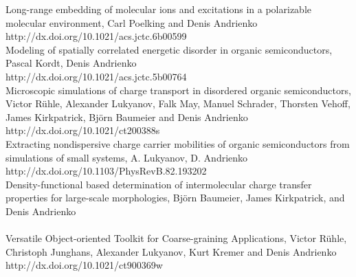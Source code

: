 \vspace{0.1cm}
\noindent
\cite{poelking_long-range_2016} Long-range embedding of molecular ions and excitations in a polarizable molecular environment, Carl Poelking and Denis Andrienko \\
{http://dx.doi.org/10.1021/acs.jctc.6b00599} \\

\vspace{0.1cm}
\noindent
\cite{kordt_modeling_2016} Modeling of spatially correlated energetic disorder in organic semiconductors,
Pascal Kordt, Denis Andrienko \\
{http://dx.doi.org/10.1021/acs.jctc.5b00764} \\

\vspace{0.1cm}
\noindent
\cite{ruhle_microscopic_2011} Microscopic simulations of charge transport in disordered organic semiconductors, 
Victor R\"uhle, Alexander Lukyanov, Falk May, Manuel Schrader, Thorsten Vehoff, James Kirkpatrick, Bj\"orn Baumeier and Denis Andrienko \\
{http://dx.doi.org/10.1021/ct200388s} \\

\vspace{0.1cm}
\noindent
\cite{lukyanov_extracting_2010} Extracting nondispersive charge carrier mobilities of organic semiconductors from simulations of small systems, A. Lukyanov, D. Andrienko \\
{http://dx.doi.org/10.1103/PhysRevB.82.193202} \\

\vspace{0.1cm}
\noindent
\cite{baumeier_density-functional_2010}
      Density-functional based determination of intermolecular charge transfer properties for large-scale morphologies, Bj{\"o}rn Baumeier,  James Kirkpatrick, and Denis Andrienko \\
        \\

\vspace{0.1cm}
\noindent
\cite{ruhle_versatile_2009} Versatile Object-oriented Toolkit for Coarse-graining Applications, 
Victor R\"uhle, Christoph Junghans, Alexander Lukyanov, Kurt Kremer and Denis Andrienko \\
{http://dx.doi.org/10.1021/ct900369w}

